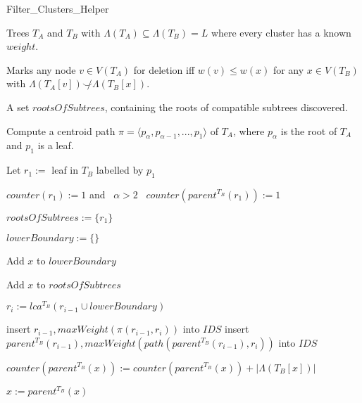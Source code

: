\documentclass{article}
\newcommand{\compatible}{\smile}
\newcommand{\leafset}{\Lambda}
\begin{document}
    \begin{algorithm}
        \caption{Filter\_Clusters\_Helper}
        \label{alg:filterclustershelper}

        \begin{algorithmic}[1]
            \Input Trees $T_A$ and $T_B$ with $\leafset(T_A) \subseteq \leafset(T_B) = L$ where every cluster has a known $weight$.

            \SideEffect Marks any node $v \in V(T_A)$ for deletion iff $w(v) \leq w(x)$ for any $x \in V(T_B)$ with $\leafset(T_A[v]) \not\compatible \leafset(T_B[x])$.

            \Output A set $rootsOfSubtrees$, containing the roots of compatible subtrees discovered.

            \State Compute a centroid path $\pi = \langle p_{\alpha}, p_{\alpha - 1}, ..., p_1 \rangle$ of $T_A$, where $p_{\alpha}$ is the root of $T_A$ and $p_1$ is a leaf.

            \State Let $r_1 :=$ leaf in $T_B$ labelled by $p_1$

            \State $counter(r_1) := 1$ and \algorithmicif\ $\alpha > 2$ \algorithmicthen\ $counter(parent^{T_B}(r_1)) := 1$

            \State $rootsOfSubtrees := \{r_1\}$

                \State $lowerBoundary := \{\}$

                        \State Add $x$ to $lowerBoundary$

                        \State Add $x$ to $rootsOfSubtrees$
                    \EndFor
                \EndFor

                \State $r_i := lca^{T_B}(r_{i-1} \cup lowerBoundary)$

                \If{$counter(r_{i-1}) < |\leafset(T_B[r_{i-1}])|$}
                    \State insert $r_{i-1}, maxWeight(\pi(r_{i-1}, r_i))$ into $IDS$
                \Else
                    \State insert $parent^{T_B}(r_{i-1}), maxWeight(path(parent^{T_B}(r_{i-1}), r_i))$ into $IDS$
                \EndIf

                    \State $counter(parent^{T_B}(x)) := counter(parent^{T_B}(x)) + |\leafset(T_B[x])|$

                    \State $x := parent^{T_B}(x)$


\end{algorithmic}
\end{algorithm}
\end{document}

